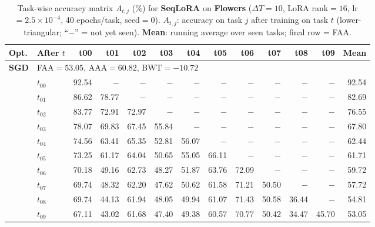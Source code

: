 
\begin{table}[ht]
\centering
\caption{%
  Task-wise accuracy matrix $A_{t,j}$ (\%) for \textbf{SeqLoRA} on \textbf{Flowers} ($\Delta T=10$, LoRA rank$=16$, lr$=2.5\times10^{-4}$, 40 epochs/task, seed$=0$).
  $A_{t,j}$: accuracy on task $j$ after training on task $t$  (lower-triangular; ``$-$'' = not yet seen).
  \textbf{Mean}: running average over seen tasks; final row = FAA.
}
\label{tab:raw_seqlora_flowers}
\setlength{\tabcolsep}{2.8pt}
\renewcommand{\arraystretch}{0.88}
\scriptsize
\begin{tabular}{@{}l l r r r r r r r r r r r@{}}
\toprule
\textbf{Opt.} & \textbf{After $t$} & \textbf{t00} & \textbf{t01} & \textbf{t02} & \textbf{t03} & \textbf{t04} & \textbf{t05} & \textbf{t06} & \textbf{t07} & \textbf{t08} & \textbf{t09} & \textbf{Mean} \\
\midrule
\multirow{11}{*}{\textbf{SGD}} & \multicolumn{12}{l}{\quad\small FAA$=53.05$,\; AAA$=60.82$,\; BWT$=-10.72$} \\
 & $t_{00}$ & 92.54 & $-$ & $-$ & $-$ & $-$ & $-$ & $-$ & $-$ & $-$ & $-$ & 92.54 \\
 & $t_{01}$ & 86.62 & 78.77 & $-$ & $-$ & $-$ & $-$ & $-$ & $-$ & $-$ & $-$ & 82.69 \\
 & $t_{02}$ & 83.77 & 72.91 & 72.97 & $-$ & $-$ & $-$ & $-$ & $-$ & $-$ & $-$ & 76.55 \\
 & $t_{03}$ & 78.07 & 69.83 & 67.45 & 55.84 & $-$ & $-$ & $-$ & $-$ & $-$ & $-$ & 67.80 \\
 & $t_{04}$ & 74.56 & 63.41 & 65.35 & 52.81 & 56.07 & $-$ & $-$ & $-$ & $-$ & $-$ & 62.44 \\
 & $t_{05}$ & 73.25 & 61.17 & 64.04 & 50.65 & 55.05 & 66.11 & $-$ & $-$ & $-$ & $-$ & 61.71 \\
 & $t_{06}$ & 70.18 & 49.16 & 62.73 & 48.27 & 51.87 & 63.76 & 72.09 & $-$ & $-$ & $-$ & 59.72 \\
 & $t_{07}$ & 69.74 & 48.32 & 62.20 & 47.62 & 50.62 & 61.58 & 71.21 & 50.50 & $-$ & $-$ & 57.72 \\
 & $t_{08}$ & 69.74 & 44.13 & 61.94 & 48.05 & 49.94 & 61.07 & 71.43 & 50.58 & 36.44 & $-$ & 54.81 \\
 & $t_{09}$ & 67.11 & 43.02 & 61.68 & 47.40 & 49.38 & 60.57 & 70.77 & 50.42 & 34.47 & 45.70 & 53.05 \\

\end{tabular}
\end{table}
